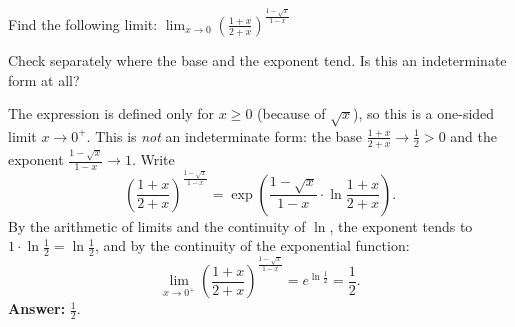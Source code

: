 
\begin{question}
Find the following limit:
$\displaystyle\lim_{x\to0}\left(\frac{1+x}{2+x}\right)^{\frac{1-\sqrt{x}}{1-x}}$
\end{question}

\begin{hint}
Check separately where the base and the exponent tend. Is this an indeterminate form at all?
\end{hint}

\begin{solution}
The expression is defined only for $x\ge0$ (because of $\sqrt x$), so this is a one-sided limit $x\to0^+$.
This is \emph{not} an indeterminate form: the base $\frac{1+x}{2+x}\to\frac12>0$ and the exponent $\frac{1-\sqrt x}{1-x}\to1$. Write
\[
\left(\frac{1+x}{2+x}\right)^{\frac{1-\sqrt{x}}{1-x}}=\exp\left(\frac{1-\sqrt{x}}{1-x}\cdot\ln\frac{1+x}{2+x}\right).
\]
By the arithmetic of limits and the continuity of $\ln$, the exponent tends to $1\cdot\ln\frac12=\ln\frac12$, and by the continuity of the exponential function:
\[
\lim_{x\to0^+}\left(\frac{1+x}{2+x}\right)^{\frac{1-\sqrt{x}}{1-x}}=e^{\ln\frac12}=\frac12.
\]
\textbf{Answer:} $\frac12$.
\end{solution}
